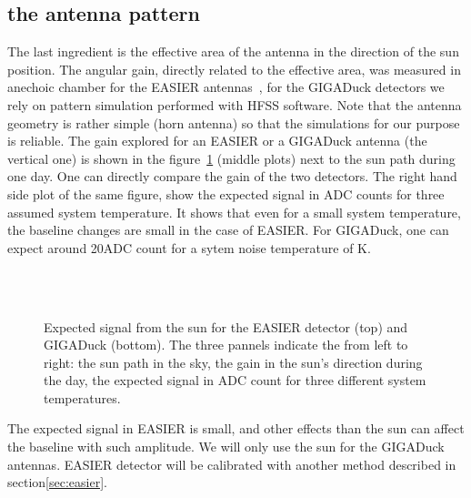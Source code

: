 \subsection{the antenna pattern}
The  last ingredient  is  the effective  area  of the  antenna in  the
direction of the sun position.   The angular gain, directly related to
the effective  area, was measured  in anechoic chamber for  the EASIER
antennas~\cite{rapportdemesurechambreanechoic},   for   the   GIGADuck
detectors we rely on  pattern simulation performed with HFSS software.
Note that the antenna geometry is rather simple (horn antenna) so that
the simulations for our purpose  is reliable. The gain explored for an
EASIER  or a  GIGADuck  antenna (the  vertical  one) is  shown in  the
figure~\ref{fig:completesim}  (middle  plots)  next  to the  sun  path
during  one  day.   One can  directly  compare  the  gain of  the  two
detectors.   The right hand  side plot  of the  same figure,  show the
expected signal in ADC counts for three assumed system temperature. It
shows that even  for a small system temperature,  the baseline changes
are small in  the case of EASIER. For GIGADuck,  one can expect around
20ADC count for a sytem noise temperature of \unit[50]{K}.
\begin{figure}[!ht]
  \centering
  \hspace*{-3ex}
  \\
  \\
  \caption{Expected signal from the  sun for the EASIER detector (top)
    and GIGADuck (bottom). The three pannels indicate the from left to
    right: the  sun path in the  sky, the gain in  the sun's direction
    during  the  day, the  expected  signal  in  ADC count  for  three
    different system temperatures.}
  \label{fig:completesim}
\end{figure}
The expected signal in EASIER is small, and other effects than the sun
can affect the baseline with such  amplitude. We will only use the sun
for the  GIGADuck antennas.  EASIER  detector will be  calibrated with
another method described  in section\ref{sec:easier}.


